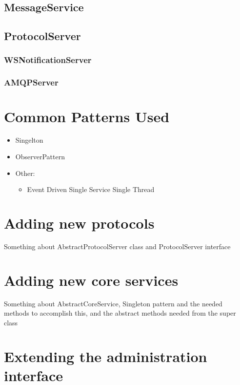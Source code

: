 \subsection{MessageService}

\subsection{ProtocolServer}
 
\subsubsection{WSNotificationServer}

\subsubsection{AMQPServer}

\section{Common Patterns Used}
\label{sec:common-patterns-used}

\begin{itemize}
\item Singelton
\item ObserverPattern
\item Other: \begin{itemize}
\item Event Driven Single Service Single Thread
\end{itemize}
\end{itemize}

\section{Adding new protocols}

Something about AbstractProtocolServer class and ProtocolServer interface

\section{Adding new core services}
\label{sec:adding-new-core-services}

Something about AbstractCoreService, Singleton pattern and the needed methods to accomplish this, and the abstract methods needed from the super class

\section{Extending the administration interface}
\label{sec:adding-new-panes}

